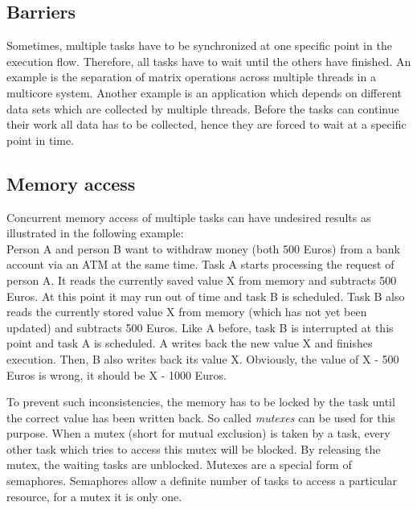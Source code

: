 \subsection{Barriers}\label{ss_barriers}
Sometimes, multiple tasks have to be synchronized at one specific point in the execution flow.
Therefore, all tasks have to wait until the others have finished.
An example is the separation of matrix operations across multiple threads in a multicore system. 
Another example is an application which depends on different data sets which are collected by multiple threads.
Before the tasks can continue their work all data has to be collected, hence they are forced to wait at a specific point in time.

\subsection{Memory access}\label{ss_memory_access}
Concurrent memory access of multiple tasks can have undesired results as illustrated in the following example:\\
Person A and person B want to withdraw money (both 500 Euros) from a bank account via an ATM at the same time.
Task A starts processing the request of person A.
It reads the currently saved value X from memory and subtracts 500 Euros.
At this point it may run out of time and task B is scheduled.
Task B also reads the currently stored value X from memory (which has not yet been updated) and subtracts 500 Euros.
Like A before, task B is interrupted at this point and task A is scheduled.
A writes back the new value X and finishes execution.
Then, B also writes back its value X.
Obviously, the value of X - 500 Euros is wrong, it should be X - 1000 Euros. 
\par
To prevent such inconsistencies, the memory has to be locked by the task until the correct value has been written back.
So called \textit{mutexes} can be used for this purpose.
When a mutex (short for mutual exclusion) is taken by a task, every other task which tries to access this mutex will be blocked.
By releasing the mutex, the waiting tasks are unblocked.
Mutexes are a special form of semaphores.
Semaphores allow a definite number of tasks to access a particular resource, for a mutex it is only one.

